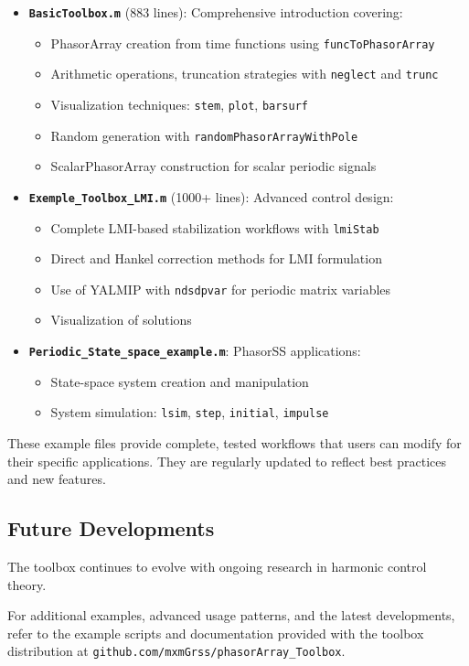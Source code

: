 \documentclass[11pt,a4paper]{article}
\begin{document}
\begin{itemize}
    \item \textbf{\texttt{BasicToolbox.m}} (883 lines): Comprehensive introduction covering:
    \begin{itemize}
        \item PhasorArray creation from time functions using \texttt{funcToPhasorArray}
        \item Arithmetic operations, truncation strategies with \texttt{neglect} and \texttt{trunc}
        \item Visualization techniques: \texttt{stem}, \texttt{plot}, \texttt{barsurf}
        \item Random generation with \texttt{randomPhasorArrayWithPole}
        \item ScalarPhasorArray construction for scalar periodic signals
    \end{itemize}
    

    \item \textbf{\texttt{Exemple\_Toolbox\_LMI.m}} (1000+ lines): Advanced control design:
    \begin{itemize}
        \item Complete LMI-based stabilization workflows with \texttt{lmiStab}
        \item Direct and Hankel correction methods for LMI formulation
        \item Use of YALMIP with \texttt{ndsdpvar} for periodic matrix variables
        \item Visualization of solutions 
    \end{itemize}


    \item \textbf{\texttt{Periodic\_State\_space\_example.m}}: PhasorSS applications:
    \begin{itemize}
        \item State-space system creation and manipulation
        \item System simulation: \texttt{lsim}, \texttt{step}, \texttt{initial}, \texttt{impulse}
    \end{itemize}
\end{itemize}


These example files provide complete, tested workflows that users can modify for their specific applications. They are regularly updated to reflect best practices and new features.

\subsection{Future Developments}

The toolbox continues to evolve with ongoing research in harmonic control theory. 

For additional examples, advanced usage patterns, and the latest developments, refer to the example scripts and documentation provided with the toolbox distribution at \texttt{github.com/mxmGrss/phasorArray\_Toolbox}.
\end{document}

